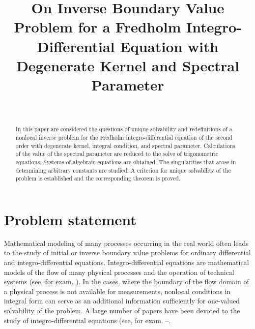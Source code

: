 ﻿\documentclass[
11pt,%
tightenlines,%
twoside,%
onecolumn,%
nofloats,%
nobibnotes,%
nofootinbib,%
superscriptaddress,%
noshowpacs,%
centertags]%
{revtex4}
\begin{document}

\title{On Inverse Boundary Value Problem for a Fredholm Integro-Differential Equation with Degenerate Kernel and Spectral Parameter}

\author{~}



\received{}

\begin{abstract}
In this paper are considered the questions of unique solvability and redefinitions of a nonlocal inverse problem for the Fredholm integro-differential equation of the second order with degenerate kernel, integral condition, and spectral parameter. Calculations of the value of the spectral parameter are reduced to the solve of trigonometric equations. Systems of algebraic equations are obtained. The singularities that arose in determining arbitrary constants are studied. A criterion for unique solvability of the problem is established and the corresponding theorem is proved.
\end{abstract}
\subclass{}

\maketitle



\section{Problem statement}

Mathematical modeling of many processes occurring in the real world often leads to the study of initial or inverse boundary value problems for ordinary differential and integro-differential equations. Integro-differential equations are mathematical models of the flow of many physical processes and the operation of technical systems (see, for exam. \cite{tur1}). In the cases, where the boundary of the flow domain of a physical process is not available for measurements, nonlocal conditions in integral form can serve as an additional information sufficiently for one-valued solvability of the problem. A large number of papers have been devoted to the study of integro-differential equations (see, for exam. \cite{tur2}--\cite{tur9}.
\end{document}
